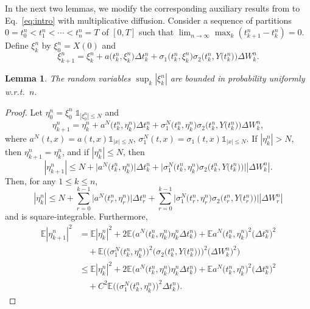 \documentclass[numbers,compress,v1.0.1]{vmsta}
\newtheorem{lemma}{Lemma}
\theoremstyle{remark}
\newcommand{\E}{\mathbb E}
\newcommand{\ind}{\mathds1}
\newcommand*{\abs}[1]{\left\lvert#1\right\rvert}
\begin{document}
In the next two lemmas, we modify the corresponding auxiliary results
from \cite{Skorokhod65} to Eq.~\eqref{eq:intro} with multiplicative
diffusion. Consider a sequence of partitions $0=t_0^n <t_1^n
<\cdots<t_n^n=T$ of $[0,T]$ such that $\lim_{n\rightarrow\infty} \max_k (t_{k+1}^n-t_k^n )=0$.
Define $\xi_k^n$ by $\xi_0^n=X(0)$ and
%
\[
\xi_{k+1}^n=\xi_k^n+a
\bigl(t_k^n,\xi_k^n\bigr)\Delta
t_k^n+\sigma_1\bigl(t_k^n,
\xi_k^n\bigr) \sigma_2\bigl(t_k^n,Y
\bigl(t_k^n\bigr)\bigr)\Delta W_k^n.
\]
%
\begin{lemma}\label{lem1}
The random variables $\sup_k|\xi_k^n|$ are bounded in
probability uniformly w.r.t.\ $n$.
\end{lemma}
%
\begin{proof}
Let $\eta_0^n=\xi_0^n\; \ind_{\abs{\xi_0^n} \leq N}$ and
%
\begin{equation}
\label{eq:2.} \eta_{k+1}^n=\eta_k^n+a^N
\bigl(t_k^n,\eta_k^n\bigr)\Delta
t_k^n+\sigma^N_1
\bigl(t_k^n,\eta_k^n\bigr)
\sigma_2\bigl(t_k^n,Y\bigl(t_k^n
\bigr)\bigr)\Delta W_k^n,
\end{equation}
%
where $a^N(t,x)=a(t,x)\ind_{\abs{x} \leq N}$,
$\sigma^N_1(t,x)=\sigma_1(t,x)\ind_{\abs{x} \leq N}$.
If
$|\eta_k^n| > N$, then $\eta_{k+1}^n=\eta_k^n$, and if
$|\eta_k^n|\leq N$, then
%
\[
\abs{\eta_{k+1}^n} \leq N + \big|a^N
\bigl(t_k^n,\eta_k^n\bigr)\big|
\Delta t_k^n+\big|\sigma^N_1
\bigl(t_k^n,\eta_k^n\bigr)
\sigma_2\bigl(t_k^n,Y\bigl(t_k^n
\bigr)\bigr)\big|\abs{\Delta W_k^n}.
\]
%
Then, for
any $ 1 \leq k \leq n$,
%
\[
\abs{\eta_k^n}\leq N + \sum
_{r=0}^{k-1}\big|a^N\bigl(t_r^n,
\eta_r^n\bigr)\big| \Delta t_r^n+
\sum_{r=0}^{k-1} \big|\sigma^N_1
\bigl(t_r^n,\eta_r^n\bigr)
\sigma_2\bigl(t_r^n,Y\bigl(t_r^n
\bigr)\bigr)\big|\abs{\Delta W_r^n}
\]
%
and is square-integrable.
Furthermore,
%
\begin{align*}
\E\abs{\eta_{k+1}^n}^2&=\E\abs{
\eta_k^n}^2+2 \E \bigl(a^N
\bigl(t_k^n,\eta _k^n\bigr)
\eta_k^n \Delta t_k^n \bigr) +\E
a^N\bigl(t_k^n,\eta_k^n
\bigr)^2 \bigl(\Delta t_k^n
\bigr)^2
\\
&\quad+\E \bigl( \bigl(\sigma^N_1\bigl(t_k^n,
\eta_k^n\bigr) \bigr)^2 \bigl(
\sigma_2\bigl(t_k^n,Y\bigl(t_k^n
\bigr)\bigr)\bigr)^2 \bigl(\Delta W_k^n
\bigr)^2 \bigr)
\\
&\leq\E\abs{\eta_k^n}^2+2 \E
\bigl(a^N\bigl(t_k^n,\eta_k^n
\bigr)\eta_k^n \Delta t_k^n
\bigr)+\E a^N\bigl(t_k^n,
\eta_k^n\bigr)^2 \bigl(\Delta
t_k^n\bigr)^2
\\
&\quad+C^2 \E \bigl( \bigl(\sigma^N_1
\bigl(t_k^n,\eta_k^n \bigr)
\bigr)^2 \Delta t_k^n \bigr).
\end{align*}

\end{proof}
\end{document}
